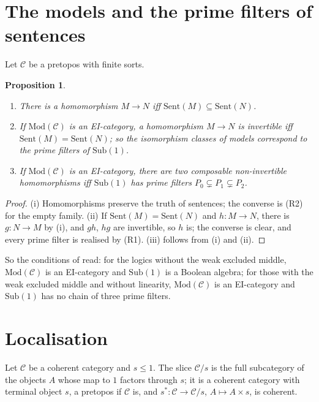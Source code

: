 \documentclass[11pt]{amsart}
\newtheorem{prop}[thm]{Proposition}
\theoremstyle{definition}
\newcommand{\Sub}{\mathrm{Sub}}
\newcommand{\Mod}{\mathrm{Mod}}
\newcommand{\Sent}{\mathrm{Sent}}
\newcommand{\cC}{\mathcal C}
\begin{document}
\section{The models and the prime filters of sentences}

Let $\cC$ be a pretopos with finite sorts.

\begin{prop}\label{prop:spec}
\begin{enumerate}
\item[(i)] There is a homomorphism $M\to N$ iff $\Sent(M)\subseteq
\Sent(N)$.
\item[(ii)] If $\Mod(\cC)$ is an EI-category, a homomorphism $M\to N$
is invertible iff $\Sent(M)=\Sent(N)$; so the isomorphism classes of
models correspond to the prime filters of $\Sub(1)$.
\item[(iii)] If $\Mod(\cC)$ is an EI-category, there are two
composable non-invertible homomorphisms iff $\Sub(1)$ has prime
filters $P_0\subsetneq P_1\subsetneq P_2$.
\end{enumerate}
\end{prop}
\begin{proof}
(i) Homomorphisms preserve the truth of sentences; the converse is
(R2) for the empty family. (ii) If $\Sent(M)=\Sent(N)$ and $h\colon
M\to N$, there is $g\colon N\to M$ by (i), and $gh$, $hg$ are
invertible, so $h$ is; the converse is clear, and every prime filter
is realised by (R1). (iii) follows from (i) and (ii).
\end{proof}

So the conditions of \cite[Thm.~1.1]{Finsorts} read: for the logics
without the weak excluded middle, $\Mod(\cC)$ is an EI-category and
$\Sub(1)$ is a Boolean algebra; for those with the weak excluded
middle and without linearity, $\Mod(\cC)$ is an EI-category and
$\Sub(1)$ has no chain of three prime filters.

\section{Localisation}\label{sec:loc}

Let $\cC$ be a coherent category and $s\le1$. The slice $\cC/s$ is the
full subcategory of the objects $A$ whose map to $1$ factors through
$s$; it is a coherent category with terminal object $s$, a pretopos if
$\cC$ is, and $s^*\colon\cC\to\cC/s$, $A\mapsto A\times s$, is
coherent.
\end{document}
